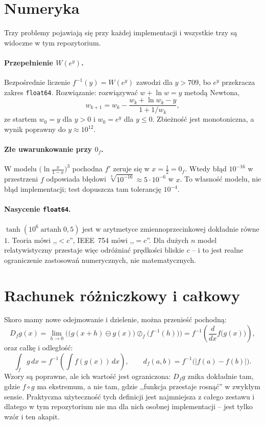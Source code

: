 \documentclass[11pt,a4paper]{article}
\newcommand{\ff}{f^{-1}}
\newcommand{\op}[1]{\mathbin{#1}}
\begin{document}
\section{Numeryka}\label{sec:numeryka}

Trzy problemy pojawiają się przy każdej implementacji i wszystkie trzy są
widoczne w tym repozytorium.

\paragraph{Przepełnienie $W(e^{y})$.} Bezpośrednie liczenie $\ff(y)=W(e^{y})$
zawodzi dla $y>709$, bo $e^{y}$ przekracza zakres \texttt{float64}. Rozwiązanie:
rozwiązywać $w+\ln w=y$ metodą Newtona,
\begin{equation}
w_{k+1}=w_{k}-\frac{w_{k}+\ln w_{k}-y}{1+1/w_{k}},
\end{equation}
ze startem $w_0=y$ dla $y>0$ i $w_0=e^{y}$ dla $y\le0$. Zbieżność jest
monotoniczna, a wynik poprawny do $y\approx10^{12}$.

\paragraph{Złe uwarunkowanie przy $0_f$.} W modelu $\big(\ln\frac{x}{1-x}\big)^{3}$
pochodna $f'$ zeruje się w $x=\tfrac12=0_f$. Wtedy błąd $10^{-16}$ w przestrzeni
$f$ odpowiada błędowi $\sqrt[3]{10^{-16}}\approx5\cdot10^{-6}$ w $x$. To własność
modelu, nie błąd implementacji; test dopuszcza tam tolerancję $10^{-4}$.

\paragraph{Nasycenie \texttt{float64}.} $\tanh(10^{6}\operatorname{artanh}0{,}5)$
jest w arytmetyce zmiennoprzecinkowej dokładnie równe $1$. Teoria mówi
,,$<c$'', IEEE~754 mówi ,,$=c$''. Dla dużych $n$ model relatywistyczny przestaje
więc odróżniać prędkości bliskie $c$ -- i to jest realne ograniczenie
zastosowań numerycznych, nie matematycznych.

\section{Rachunek różniczkowy i całkowy}

Skoro mamy nowe odejmowanie i dzielenie, można przenieść pochodną:
\begin{equation}
D_f g(x)=\lim_{h\to0}\Big(\big(g(x+h)\ominus g(x)\big)\op{\oslash_f}
\big(\ff(h)\big)\Big)=\ff\!\left(\frac{d}{dx}f\big(g(x)\big)\right),
\end{equation}
oraz całkę i odległość:
\begin{equation}
\int_f g\,dx=\ff\!\left(\int f(g(x))\,dx\right),\qquad
d_f(a,b)=\ff\big(|f(a)-f(b)|\big).
\end{equation}
Wzory są poprawne, ale ich wartość jest ograniczona: $D_f g$ znika dokładnie
tam, gdzie $f\circ g$ ma ekstremum, a nie tam, gdzie ,,funkcja przestaje
rosnąć'' w zwykłym sensie. Praktyczna użyteczność tych definicji jest najmniejsza
z całego zestawu i dlatego w tym repozytorium nie ma dla nich osobnej
implementacji -- jest tylko wzór i ten akapit.
\end{document}
